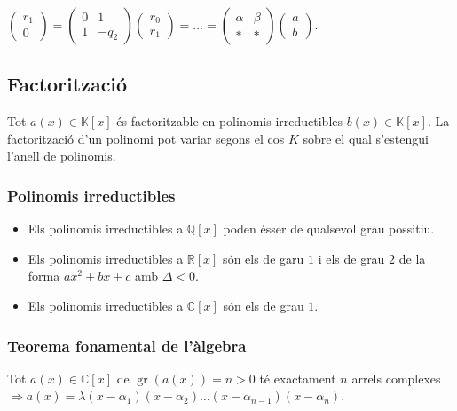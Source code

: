 \begin{enumerate}[a)]
         \subitem $\begin{pmatrix} r_{1} \\ 0 \end{pmatrix} = \begin{pmatrix} 0 & 1 \\ 1 & -q_{2} \end{pmatrix} \begin{pmatrix} r_{0} \\ r_{1} \end{pmatrix} = \dots = \begin{pmatrix} \alpha & \beta \\ \ast & \ast \end{pmatrix} \begin{pmatrix} a \\ b \end{pmatrix}$.
\end{enumerate}

\subsection{Factorització}
Tot $a(x) \in \mathbb{K} [x]$ és factoritzable en polinomis irreductibles $b(x) \in \mathbb{K} [x]$. La factorització d'un polinomi pot variar segons el cos $K$ sobre el qual s'estengui l'anell de polinomis.

\subsubsection*{Polinomis irreductibles}
\begin{itemize}
    \item Els polinomis irreductibles a $\mathbb{Q} [x]$ poden ésser de qualsevol grau possitiu.
    \item Els polinomis irreductibles a $\mathbb{R} [x]$ són els de garu $1$ i els de grau $2$ de la forma $a x^{2} + b x +c$ amb $\Delta < 0$.
    \item Els polinomis irreductibles a $\mathbb{C} [x]$ són els de grau $1$.
\end{itemize}

\subsubsection*{Teorema fonamental de l'àlgebra}
Tot $a(x) \in \mathbb{C} [x]$ de $\operatorname{gr} (a(x)) = n > 0$ té exactament $n$ arrels complexes $\Rightarrow a(x) = \lambda (x - \alpha_{1}) (x - \alpha_{2}) \dots (x - \alpha_{n-1}) (x - \alpha_{n})$. 